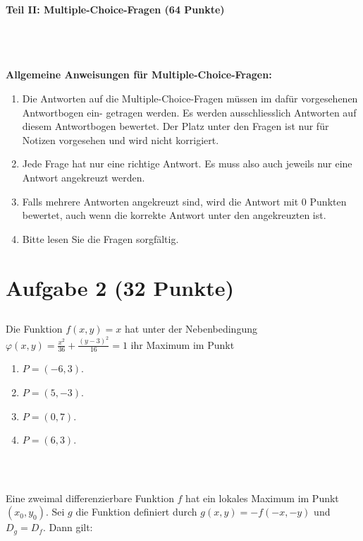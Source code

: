 \begin{Large}
\textbf{Teil II: Multiple-Choice-Fragen (64 Punkte)}
\end{Large}
\\
\\
\\
\textbf{Allgemeine Anweisungen für Multiple-Choice-Fragen:}
\\
\renewcommand{\labelenumi}{(\roman{enumi})}
\begin{enumerate}
\item
Die Antworten auf die Multiple-Choice-Fragen müssen im dafür vorgesehenen Antwortbogen ein-
getragen werden. Es werden ausschliesslich Antworten auf diesem Antwortbogen bewertet. Der
Platz unter den Fragen ist nur für Notizen vorgesehen und wird nicht korrigiert.

\item
Jede Frage hat nur eine richtige Antwort. Es muss also auch jeweils nur eine Antwort angekreuzt
werden.

\item
Falls mehrere Antworten angekreuzt sind, wird die Antwort mit 0 Punkten bewertet, auch wenn
die korrekte Antwort unter den angekreuzten ist.

\item
Bitte lesen Sie die Fragen sorgfältig.

\end{enumerate}
\newpage
\section*{Aufgabe 2 (32 Punkte)}
\vspace{0.4cm}
\subsection*{}
Die Funktion $ f(x,y)  = x$ hat unter der Nebenbedingung $\varphi(x,y) = \frac{x^2}{36} + \frac{(y-3)^2}{16} = 1 $ ihr Maximum im Punkt
\renewcommand{\labelenumi}{(\alph{enumi})}
\begin{enumerate}
\item $ P = (-6,3) $.
\item $ P = (5,-3) $.
\item $ P = (0,7) $.
\item $ P = (6,3) $.
\end{enumerate}
\ \\
\subsection*{}
Eine zweimal differenzierbare Funktion $ f  $ hat ein lokales Maximum im Punkt $ (x_0,y_0) $.
Sei $ g  $ die Funktion definiert durch $ g(x,y) = - f(-x,-y)  $ und $ D_g = D_f $. Dann gilt:

